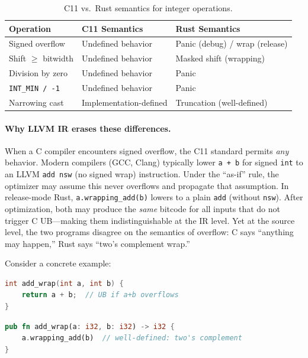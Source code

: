 \documentclass[11pt]{article}
\begin{document}
\begin{table}[t]
\centering
\caption{C11 vs.\ Rust semantics for integer operations.}\label{tab:semgap}
\begin{tabular}{@{}lll@{}}
\toprule
\textbf{Operation} & \textbf{C11 Semantics} & \textbf{Rust Semantics} \\
\midrule
Signed overflow        & Undefined behavior      & Panic (debug) / wrap (release) \\
Shift $\geq$ bitwidth  & Undefined behavior      & Masked shift (wrapping)        \\
Division by zero       & Undefined behavior      & Panic                          \\
\texttt{INT\_MIN / -1} & Undefined behavior      & Panic                          \\
Narrowing cast         & Implementation-defined  & Truncation (well-defined)      \\
\bottomrule
\end{tabular}
\end{table}

\paragraph{Why LLVM IR erases these differences.}
When a C compiler encounters signed overflow, the C11 standard permits
\emph{any} behavior.  Modern compilers (GCC, Clang) typically lower
\texttt{a + b} for signed \texttt{int} to an LLVM \texttt{add nsw} (no
signed wrap) instruction.  Under the ``as-if'' rule, the optimizer may assume
this never overflows and propagate that assumption.  In release-mode Rust,
\texttt{a.wrapping\_add(b)} lowers to a plain \texttt{add} (without
\texttt{nsw}).  After optimization, both may produce the \emph{same} bitcode
for all inputs that do not trigger C UB---making them indistinguishable at
the IR level.  Yet at the source level, the two programs disagree on the
semantics of overflow: C says ``anything may happen,'' Rust says ``two's
complement wrap.''

Consider a concrete example:

\begin{lstlisting}[language=C,caption={C function with signed overflow UB.},label={lst:c-add}]
int add_wrap(int a, int b) {
    return a + b;  // UB if a+b overflows
}
\end{lstlisting}

\begin{lstlisting}[language=Rust,caption={Rust translation using wrapping arithmetic.},label={lst:rust-add}]
pub fn add_wrap(a: i32, b: i32) -> i32 {
    a.wrapping_add(b)  // well-defined: two's complement
}
\end{lstlisting}
\end{document}
